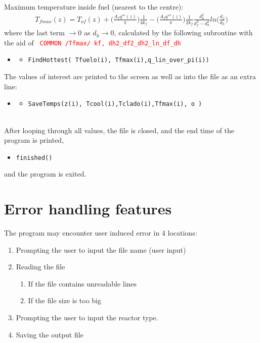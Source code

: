 \documentclass[a4paper, 12pt]{article}
\begin{document}
Maximum temperature inside fuel (nearest to the centre):
\begin{align}
T_{fmax}(z) = T_{of}(z)+ \bigg(\frac{A_f q'''(z)}{\pi}\bigg) \frac{1}{4 k_f}  
- \bigg(\frac{A_f q'''(z)}{\pi}\bigg) \frac{1}{2 k_f} \frac{d_h^2}{d_f^2-d_h^2} ln\bigg(\frac{d_f}{d_h}\bigg)\label{Tfmax}
\end{align}
where the last term $\rightarrow 0$  as $d_h\rightarrow 0$,
calculated by the following subroutine with the aid of \texttt{ \textcolor{red} {COMMON /Tfmax/ kf, dh2\_df2\_dh2\_ln\_df\_dh} }
\begin{itemize}
	\item[]
	\begin{itemize}
	\item \texttt{\textcolor{subr}{FindHottest}(   Tfuelo(i), Tfmax(i),q\_lin\_over\_pi(i))}
	\end  {itemize}
\end  {itemize}

The values of interest are printed to the screen as well as into the file as an extra line:
\begin{itemize}
	\item[]
	\begin{itemize}
	\item \texttt{\textcolor{subr}{SaveTemps}(z(i), Tcool(i),Tclado(i),Tfmax(i), o     )}
	\end  {itemize}
\end  {itemize}

\ \\
After looping through all values, the file is closed, and the end time of the program is printed,
\begin{itemize}
	\item \texttt{\textcolor{subr}{finished}()}
\end{itemize}
and the program is exited.

\section{Error handling features}
The program may encounter user induced error in 4 locations:
\begin{enumerate}
	\item Prompting the user to input the file name (user input)
	\item Reading the file
	\begin{enumerate}
		\item If the file contains unreadable lines
		\item If the file size is too big
	\end{enumerate}
	\item Prompting the user to input the reactor type.
	\item Saving the output file
\end  {enumerate}
\end{document}

